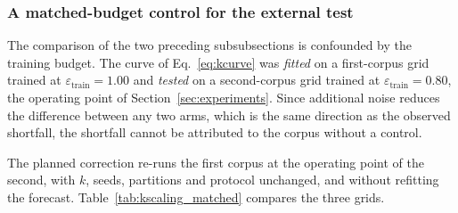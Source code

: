 %
%

\subsubsection{A matched-budget control for the external test}
\label{sec:results:kscaling:a2}

The comparison of the two preceding subsubsections is confounded by the
training budget. The curve of Eq.~\eqref{eq:kcurve} was \emph{fitted} on a
first-corpus grid trained at $\varepsilon_{\mathrm{train}} = 1.00$ and
\emph{tested} on a second-corpus grid trained at
$\varepsilon_{\mathrm{train}} = 0.80$, the operating point of
Section~\ref{sec:experiments}. Since additional noise reduces the difference
between any two arms, which is the same direction as the observed shortfall,
the shortfall cannot be attributed to the corpus without a control.

The planned correction re-runs the first corpus at the operating point
of the second, with $k$, seeds, partitions and protocol unchanged, and without
refitting the forecast. Table~\ref{tab:kscaling_matched} compares the three
grids.

